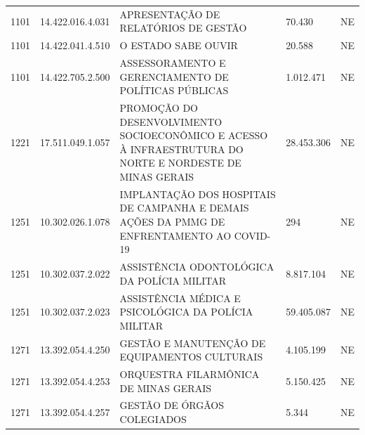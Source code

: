 \documentclass{article}
\begin{document}
\begin{longtable}[c]{m{1cm}|m{2cm}|m{10cm}|m{2cm}|m{1cm}}
\multicolumn{1}{C{1cm}|}{1101} & \multicolumn{1}{C{2cm}|}{14.422.016.4.031} & \multicolumn{1}{L{10cm}|}{APRESENTAÇÃO DE RELATÓRIOS DE GESTÃO} & \multicolumn{1}{R{2cm}|}{70.430} & \multicolumn{1}{C{1cm}}{NE} \\
\multicolumn{1}{C{1cm}|}{1101} & \multicolumn{1}{C{2cm}|}{14.422.041.4.510} & \multicolumn{1}{L{10cm}|}{O ESTADO SABE OUVIR} & \multicolumn{1}{R{2cm}|}{20.588} & \multicolumn{1}{C{1cm}}{NE} \\
\multicolumn{1}{C{1cm}|}{1101} & \multicolumn{1}{C{2cm}|}{14.422.705.2.500} & \multicolumn{1}{L{10cm}|}{ASSESSORAMENTO E GERENCIAMENTO DE POLÍTICAS PÚBLICAS} & \multicolumn{1}{R{2cm}|}{1.012.471} & \multicolumn{1}{C{1cm}}{NE} \\
\multicolumn{1}{C{1cm}|}{1221} & \multicolumn{1}{C{2cm}|}{17.511.049.1.057} & \multicolumn{1}{L{10cm}|}{PROMOÇÃO DO DESENVOLVIMENTO SOCIOECONÔMICO E ACESSO À INFRAESTRUTURA DO NORTE E NORDESTE DE MINAS GERAIS} & \multicolumn{1}{R{2cm}|}{28.453.306} & \multicolumn{1}{C{1cm}}{NE} \\
\multicolumn{1}{C{1cm}|}{1251} & \multicolumn{1}{C{2cm}|}{10.302.026.1.078} & \multicolumn{1}{L{10cm}|}{IMPLANTAÇÃO DOS HOSPITAIS DE CAMPANHA E DEMAIS AÇÕES DA PMMG DE ENFRENTAMENTO AO COVID-19} & \multicolumn{1}{R{2cm}|}{294} & \multicolumn{1}{C{1cm}}{NE} \\
\multicolumn{1}{C{1cm}|}{1251} & \multicolumn{1}{C{2cm}|}{10.302.037.2.022} & \multicolumn{1}{L{10cm}|}{ASSISTÊNCIA ODONTOLÓGICA DA POLÍCIA MILITAR} & \multicolumn{1}{R{2cm}|}{8.817.104} & \multicolumn{1}{C{1cm}}{NE} \\
\multicolumn{1}{C{1cm}|}{1251} & \multicolumn{1}{C{2cm}|}{10.302.037.2.023} & \multicolumn{1}{L{10cm}|}{ASSISTÊNCIA MÉDICA E PSICOLÓGICA DA POLÍCIA MILITAR} & \multicolumn{1}{R{2cm}|}{59.405.087} & \multicolumn{1}{C{1cm}}{NE} \\
\multicolumn{1}{C{1cm}|}{1271} & \multicolumn{1}{C{2cm}|}{13.392.054.4.250} & \multicolumn{1}{L{10cm}|}{GESTÃO E MANUTENÇÃO DE EQUIPAMENTOS CULTURAIS} & \multicolumn{1}{R{2cm}|}{4.105.199} & \multicolumn{1}{C{1cm}}{NE} \\
\multicolumn{1}{C{1cm}|}{1271} & \multicolumn{1}{C{2cm}|}{13.392.054.4.253} & \multicolumn{1}{L{10cm}|}{ORQUESTRA FILARMÔNICA DE MINAS GERAIS} & \multicolumn{1}{R{2cm}|}{5.150.425} & \multicolumn{1}{C{1cm}}{NE} \\
\multicolumn{1}{C{1cm}|}{1271} & \multicolumn{1}{C{2cm}|}{13.392.054.4.257} & \multicolumn{1}{L{10cm}|}{GESTÃO DE ÓRGÃOS COLEGIADOS} & \multicolumn{1}{R{2cm}|}{5.344} & \multicolumn{1}{C{1cm}}{NE} \\

\end{longtable}
\end{document}
